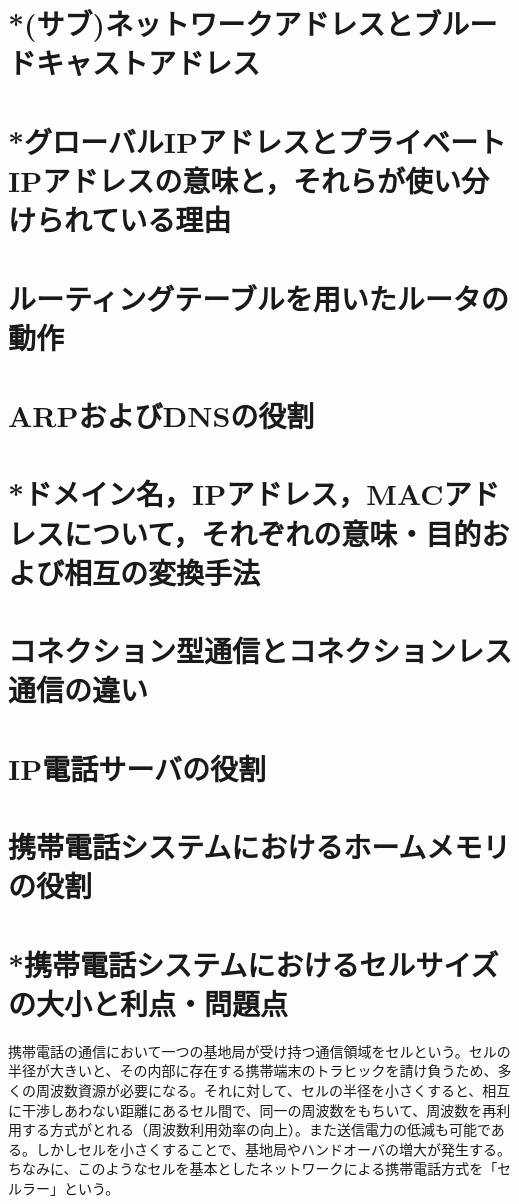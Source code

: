 \documentclass[10.5pt]{jsarticle}
\begin{document}
\section{*(サブ)ネットワークアドレスとブルードキャストアドレス}



\section{*グローバルIPアドレスとプライベートIPアドレスの意味と，それらが使い分けられている理由}



\section{ルーティングテーブルを用いたルータの動作}



\section{ARPおよびDNSの役割}



\section{*ドメイン名，IPアドレス，MACアドレスについて，それぞれの意味・目的および相互の変換手法}



\section{コネクション型通信とコネクションレス通信の違い}


\section{IP電話サーバの役割}


\section{携帯電話システムにおけるホームメモリの役割}


\section{*携帯電話システムにおけるセルサイズの大小と利点・問題点}
携帯電話の通信において一つの基地局が受け持つ通信領域をセルという。セルの半径が大きいと、その内部に存在する携帯端末のトラヒックを請け負うため、多くの周波数資源が必要になる。それに対して、セルの半径を小さくすると、相互に干渉しあわない距離にあるセル間で、同一の周波数をもちいて、周波数を再利用する方式がとれる（周波数利用効率の向上）。また送信電力の低減も可能である。しかしセルを小さくすることで、基地局やハンドオーバの増大が発生する。ちなみに、このようなセルを基本としたネットワークによる携帯電話方式を「セルラー」という。
\end{document}
